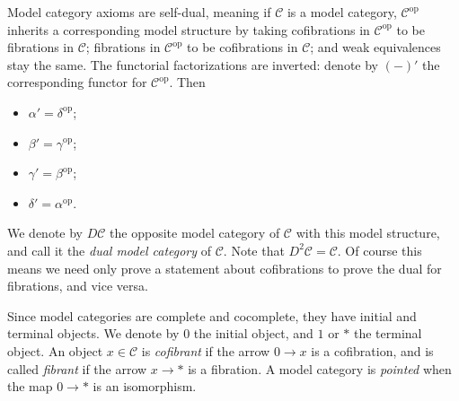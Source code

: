 \begin{remark}\label{1.1.11}
	Model category axioms are self-dual, meaning if $\mathcal{C} $ is a model category, $\mathcal{C} ^{\mathrm{op}} $ inherits a corresponding model structure by taking cofibrations in $\mathcal{C} ^{\mathrm{op}} $ to be fibrations in $\mathcal{C} $; fibrations in $\mathcal{C} ^{\mathrm{op}} $ to be cofibrations in $\mathcal{C} $; and weak equivalences stay the same. The functorial factorizations are inverted: denote by $(-)'$ the corresponding functor for $\mathcal{C} ^{\mathrm{op}} $. Then
	\begin{itemize}
		\item $\alpha' = \delta^{\mathrm{op}} $;
		\item $\beta' = \gamma^{\mathrm{op}} $;
		\item $\gamma'=\beta^{\mathrm{op}} $;
		\item $\delta'=\alpha^{\mathrm{op}} $.
	\end{itemize}
	We denote by $D\mathcal{C} $ the opposite model category of $\mathcal{C} $ with this model structure, and call it the \emph{dual model category} of $\mathcal{C} $. Note that $D^2\mathcal{C} =\mathcal{C} $. Of course this means we need only prove a statement about cofibrations to prove the dual for fibrations, and vice versa.
\end{remark}

\begin{terminology}\label{trm:1.1.12}
	Since model categories are complete and cocomplete, they have initial and terminal objects. We denote by $0$ the initial object, and $1$ or $*$ the terminal object. An object $x\in\mathcal{C} $ is \emph{cofibrant} if the arrow $0\to x$ is a cofibration, and is called \emph{fibrant} if the arrow $x\to *$ is a fibration. A model category is \emph{pointed} when the map $0\to *$ is an isomorphism.
\end{terminology}

